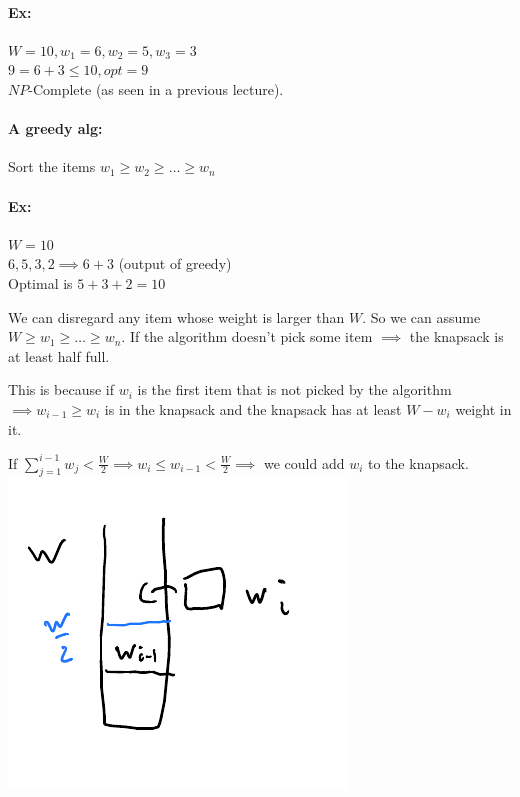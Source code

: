 \documentclass[12 pt]{article}
\begin{document}
          \paragraph{Ex:} $W=10, w_1=6,w_2=5,w_3=3$
          \\ $9 = 6+3 \leq 10, opt = 9$
          \\ $NP$-Complete (as seen in a previous lecture).
          \paragraph{A greedy alg:}
          \begin{algorithmic}
            \State Sort the items $w_1 \geq w_2 \geq \ldots \geq w_n$
                \EndIf
            \EndFor
          \end{algorithmic}
          \paragraph{Ex:} $W=10$
          \\ $6,5,3,2 \implies 6+3$ (output of greedy)
          \\ Optimal is $5+3+2 = 10$

          We can disregard any item whose weight is larger than
          $W$. So we can assume $W \geq w_1 \geq \ldots \geq w_n$. If
          the algorithm doesn't pick some item $\implies $ the
          knapsack is at least half full.

          This is because if $w_i$ is the first item that is not
          picked by the algorithm $\implies w_{i-1}\geq w_i$ is in the
          knapsack and the knapsack has at least $W-w_{i}$ weight in
          it.

          If $\sum_{j=1}^{i-1}w_j < \frac{W}{2} \implies w_i \leq
          w_{i-1}<\frac{W}{2} \implies$ we could add $w_i$ to the
          knapsack.
          \\ \includegraphics[width=.6\textwidth]{i149.pdf}
\end{document}
